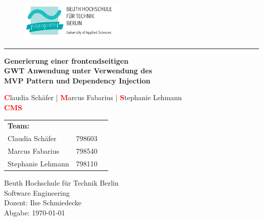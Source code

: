 \begin{titlepage}
\begin{figure}[htp] {
			\hspace{7cm} 
			\includegraphics[width=5cm]{./img/logo_beuth.png}\label{fig:beuth_logo}
		} \end{figure}
\vspace{-0.5cm}
\hrule

\vspace{3.0cm} {
  \begin{center}
    \large \textbf{Generierung einer frontendseitigen \\
    			  GWT Anwendung unter Verwendung des\\
    			  MVP Pattern und Dependency Injection}

    \vspace{0.8cm}
    \color{gray}
	    \textcolor{red}{\textbf{C}}laudia Schäfer	|
    	\textcolor{red}{\textbf{M}}arcus Fabarius	|
    	\textcolor{red}{\textbf{S}}tephanie Lehmann\\
    \textcolor{red}{\textbf{CMS}}\\
  \end{center}
}
\vspace*{\fill}

\hspace{-0.9cm} 
\begin{tabular}{l l l}
  \textbf{Team:} & \\
  Claudia Schäfer &  798603 \\
  Marcus Fabarius & 798540 \\
  Stephanie Lehmann & 798110 \\
\end{tabular}

\vspace{1.5cm}

\noindent 
Beuth Hochschule für Technik Berlin \\
Software Engineering \\
Dozent: Ilse Schmiedecke\\
\noindent 
Abgabe: \today

\thispagestyle{empty}
\end{titlepage}
